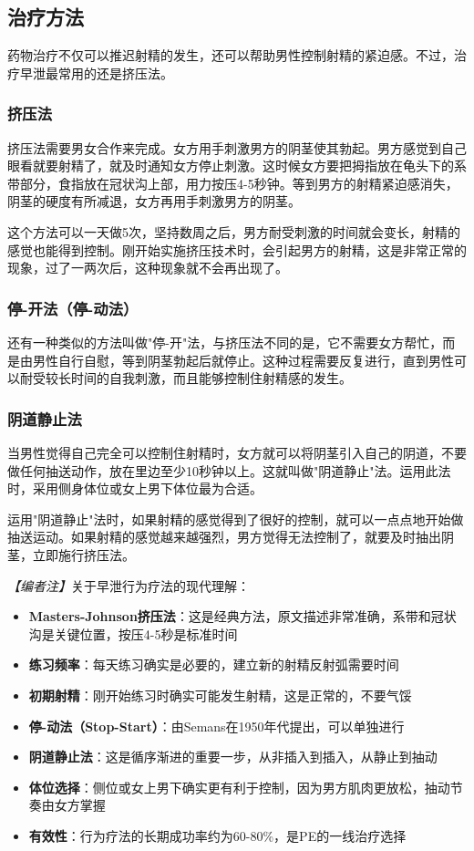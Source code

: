 \subsection{治疗方法}

药物治疗不仅可以推迟射精的发生，还可以帮助男性控制射精的紧迫感。不过，治疗早泄最常用的还是挤压法。

\subsubsection{挤压法}

挤压法需要男女合作来完成。女方用手刺激男方的阴茎使其勃起。男方感觉到自己眼看就要射精了，就及时通知女方停止刺激。这时候女方要把拇指放在龟头下的系带部分，食指放在冠状沟上部，用力按压4-5秒钟。等到男方的射精紧迫感消失，阴茎的硬度有所减退，女方再用手刺激男方的阴茎。

这个方法可以一天做5次，坚持数周之后，男方耐受刺激的时间就会变长，射精的感觉也能得到控制。刚开始实施挤压技术时，会引起男方的射精，这是非常正常的现象，过了一两次后，这种现象就不会再出现了。

\subsubsection{停-开法（停-动法）}

还有一种类似的方法叫做"停-开"法，与挤压法不同的是，它不需要女方帮忙，而是由男性自行自慰，等到阴茎勃起后就停止。这种过程需要反复进行，直到男性可以耐受较长时间的自我刺激，而且能够控制住射精感的发生。

\subsubsection{阴道静止法}

当男性觉得自己完全可以控制住射精时，女方就可以将阴茎引入自己的阴道，不要做任何抽送动作，放在里边至少10秒钟以上。这就叫做"阴道静止"法。运用此法时，采用侧身体位或女上男下体位最为合适。

运用"阴道静止"法时，如果射精的感觉得到了很好的控制，就可以一点点地开始做抽送运动。如果射精的感觉越来越强烈，男方觉得无法控制了，就要及时抽出阴茎，立即施行挤压法。

\noindent\textit{【编者注】}关于早泄行为疗法的现代理解：
\begin{itemize}
	\item \textbf{Masters-Johnson挤压法}：这是经典方法，原文描述非常准确，系带和冠状沟是关键位置，按压4-5秒是标准时间
	\item \textbf{练习频率}：每天练习确实是必要的，建立新的射精反射弧需要时间
	\item \textbf{初期射精}：刚开始练习时确实可能发生射精，这是正常的，不要气馁
	\item \textbf{停-动法（Stop-Start）}：由Semans在1950年代提出，可以单独进行
	\item \textbf{阴道静止法}：这是循序渐进的重要一步，从非插入到插入，从静止到抽动
	\item \textbf{体位选择}：侧位或女上男下确实更有利于控制，因为男方肌肉更放松，抽动节奏由女方掌握
	\item \textbf{有效性}：行为疗法的长期成功率约为60-80\%，是PE的一线治疗选择
\end{itemize}


